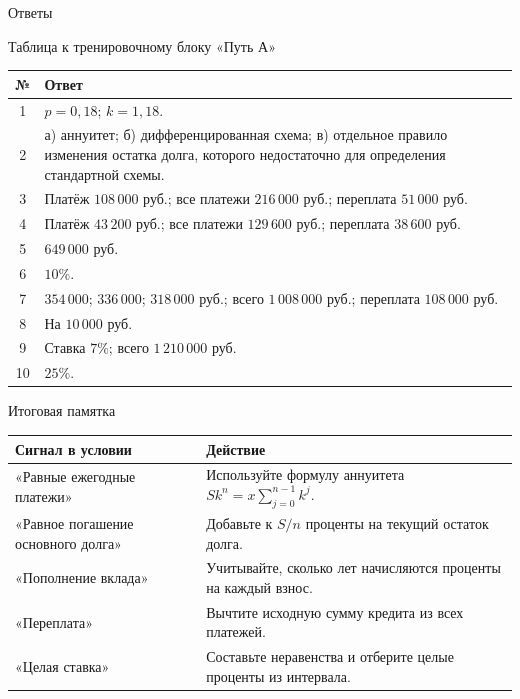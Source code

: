 \documentclass[a4paper,12pt]{article}
\begin{document}
\clearpage
\begin{center}
{\LARGE\color{accent} Ответы}\par
\vspace{2mm}
Таблица к тренировочному блоку «Путь А»
\end{center}
\vspace{5mm}
\renewcommand{\arraystretch}{1.45}
\begin{tabularx}{\linewidth}{@{}cX@{}}
\toprule
\textbf{№} & \textbf{Ответ}\\
\midrule
1 & $p=0{,}18$; $k=1{,}18$.\\
2 & а) аннуитет; б) дифференцированная схема; в) отдельное правило изменения остатка долга, которого недостаточно для определения стандартной схемы.\\
3 & Платёж $108\,000$ руб.; все платежи $216\,000$ руб.; переплата $51\,000$ руб.\\
4 & Платёж $43\,200$ руб.; все платежи $129\,600$ руб.; переплата $38\,600$ руб.\\
5 & $649\,000$ руб.\\
6 & $10\%$.\\
7 & $354\,000$; $336\,000$; $318\,000$ руб.; всего $1\,008\,000$ руб.; переплата $108\,000$ руб.\\
8 & На $10\,000$ руб.\\
9 & Ставка $7\%$; всего $1\,210\,000$ руб.\\
10 & $25\%$.\\
\bottomrule
\end{tabularx}
\vspace{16mm}
\begin{center}
\textcolor{accentdark}{\large Итоговая памятка}
\end{center}
\begin{tabularx}{\linewidth}{@{}p{.34\linewidth}X@{}}
\toprule
\textbf{Сигнал в условии} & \textbf{Действие}\\
\midrule
«Равные ежегодные платежи» & Используйте формулу аннуитета $Sk^n=x\sum_{j=0}^{n-1}k^j$.\\
«Равное погашение основного долга» & Добавьте к $S/n$ проценты на текущий остаток долга.\\
«Пополнение вклада» & Учитывайте, сколько лет начисляются проценты на каждый взнос.\\
«Переплата» & Вычтите исходную сумму кредита из всех платежей.\\
«Целая ставка» & Составьте неравенства и отберите целые проценты из интервала.\\
\bottomrule
\end{tabularx}
\end{document}
